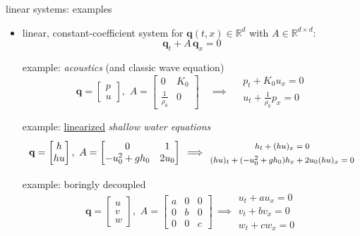 \documentclass[10pt,hyperref,dvipsnames]{beamer}
\newcommand{\bq}{\mathbf{q}}
\newcommand{\RR}{\mathbb{R}}
\begin{document}
\begin{frame}{linear systems: examples}

\begin{itemize}
\item linear, constant-coefficient system for $\bq(t,x) \in \RR^d$ with $A\in\RR^{d\times d}$:
  $$\bq_t + A\, \bq_x=0$$

\setlength{\itemindent}{11mm}
\item[example:] \emph{acoustics} (and classic wave equation)
        $$\bq = \begin{bmatrix} p \\ u \end{bmatrix}, \,\, A = \begin{bmatrix} 0 & K_0 \\ \frac{1}{\rho_0} & 0 \end{bmatrix} \quad \implies \quad \begin{matrix} p_t + K_0 u_x = 0 \\ u_t + \frac{1}{\rho_0} p_x = 0 \end{matrix}$$
\item[example:] \underline{linearized} \emph{shallow water equations}
        $$\bq = \begin{bmatrix} h \\ h u \end{bmatrix}, \,\, A = \begin{bmatrix} 0 & 1 \\ -u_0^2+gh_0 & 2 u_0 \end{bmatrix} \, \implies \, {\footnotesize \begin{matrix} {\large \strut} h_t + (hu)_x = 0 \\ {\large \strut} (h u)_t + (-u_0^2+gh_0) h_x + 2u_0 (h u)_x = 0 \end{matrix} }$$
\item[example:] boringly decoupled
        $$\bq = \begin{bmatrix} u \\ v \\ w \end{bmatrix}, \,\, A = \begin{bmatrix} a & 0 & 0 \\ 0 & b & 0 \\ 0 & 0 & c \end{bmatrix} \, \implies \begin{matrix} u_t + a u_x = 0 \\ v_t + b v_x = 0 \\ w_t + c w_x = 0 \end{matrix}$$
\end{itemize}
\end{frame}
\end{document}
